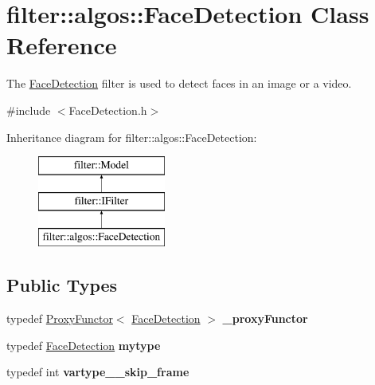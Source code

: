 \hypertarget{classfilter_1_1algos_1_1_face_detection}{}\section{filter\+:\+:algos\+:\+:Face\+Detection Class Reference}
\label{classfilter_1_1algos_1_1_face_detection}


The \hyperlink{classfilter_1_1algos_1_1_face_detection}{Face\+Detection} filter is used to detect faces in an image or a video.  




{\ttfamily \#include $<$Face\+Detection.\+h$>$}

Inheritance diagram for filter\+:\+:algos\+:\+:Face\+Detection\+:\begin{figure}[H]
\begin{center}
\leavevmode
\includegraphics[height=3.000000cm]{dd/dcd/classfilter_1_1algos_1_1_face_detection}
\end{center}
\end{figure}
\subsection*{Public Types}
\begin{DoxyCompactItemize}
\item 
\mbox{\label{classfilter_1_1algos_1_1_face_detection_a7be5df13a28b0e659f26da0181968bf1}} 
typedef \hyperlink{class_proxy_functor}{Proxy\+Functor}$<$ \hyperlink{classfilter_1_1algos_1_1_face_detection}{Face\+Detection} $>$ {\bfseries \+\_\+proxy\+Functor}
\item 
\mbox{\label{classfilter_1_1algos_1_1_face_detection_a1db68e3a857853eda1e62db6a661435e}} 
typedef \hyperlink{classfilter_1_1algos_1_1_face_detection}{Face\+Detection} {\bfseries mytype}
\item 
\mbox{\label{classfilter_1_1algos_1_1_face_detection_a9f20bce236719687bb349eb2815513f0}} 
typedef int {\bfseries vartype\+\_\+\+\_\+skip\+\_\+frame}
\end{DoxyCompactItemize}
